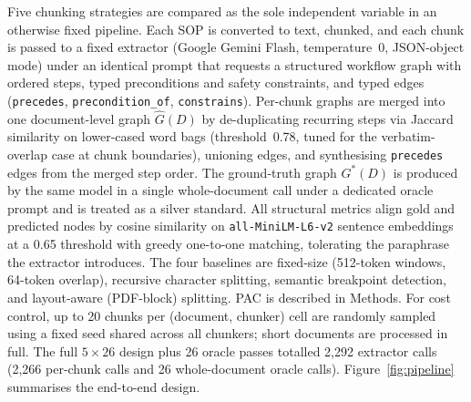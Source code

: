 \documentclass[fleqn,10pt]{wlscirep}
\begin{document}
Five chunking strategies are compared as the sole independent variable
in an otherwise fixed pipeline. Each SOP is converted to text, chunked,
and each chunk is passed to a fixed extractor (Google
Gemini Flash\cite{gemini2023}, temperature~0, JSON-object mode)
under an identical prompt that requests a structured workflow graph
with ordered steps, typed preconditions and safety constraints, and
typed edges (\texttt{precedes}, \texttt{precondition\_of},
\texttt{constrains}). Per-chunk graphs are merged into one
document-level graph $\hat{G}(D)$ by de-duplicating recurring steps via
Jaccard similarity on lower-cased word bags (threshold~0.78, tuned for
the verbatim-overlap case at chunk boundaries), unioning edges, and
synthesising \texttt{precedes} edges from the merged step order. The ground-truth
graph $G^{*}(D)$ is produced by the same model in a single whole-document
call under a dedicated oracle prompt and is treated as a silver
standard. All structural metrics align gold and predicted nodes by
cosine similarity on \texttt{all-MiniLM-L6-v2} sentence
embeddings\cite{reimers2019sbert} at a 0.65 threshold with greedy
one-to-one matching, tolerating the paraphrase the extractor introduces.
The four baselines are fixed-size (512-token windows, 64-token overlap),
recursive character splitting, semantic breakpoint detection, and
layout-aware (PDF-block) splitting. PAC is described in Methods. For
cost control, up to 20 chunks per (document, chunker) cell are randomly
sampled using a fixed seed shared across all chunkers; short documents
are processed in full. The full $5\times26$ design plus 26
oracle passes totalled 2,292 extractor calls (2,266 per-chunk calls and
26 whole-document oracle calls). Figure~\ref{fig:pipeline} summarises
the end-to-end design.
\end{document}
